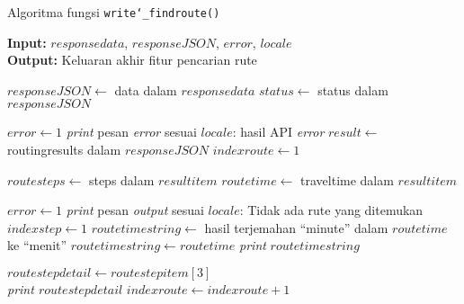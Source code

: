 \begin{algorithm}[h]
	\caption{\textendash\xspace Algoritma fungsi \texttt{write\char`_findroute()}}
	\label{alg:design-write-findroute}
	\vspace{-0.6\baselineskip}
	\begin{flushleft}
		\textbf{Input:} $responsedata$, $responseJSON$, $error$, $locale$ \\
		\textbf{Output:} Keluaran akhir fitur pencarian rute \\
	\end{flushleft}
	\vspace{-1.05\baselineskip}
	\begin{algorithmic}
		\State $responseJSON \gets$ data dalam $responsedata$
		\State $status \gets$ \textquotesingle\textquotesingle status\textquotesingle\textquotesingle\xspace dalam $responseJSON$
		
			\State $error \gets 1$
			\State \textit{print} pesan \textit{error} sesuai $locale$: hasil API \textit{error}
		\Else
			\State $result \gets$ \textquotesingle\textquotesingle routingresults\textquotesingle\textquotesingle\xspace dalam $responseJSON$
			\State $indexroute \gets 1$
			
			 
				\State $routesteps \gets$ \textquotesingle\textquotesingle steps\textquotesingle\textquotesingle\xspace dalam $resultitem$
				\State $routetime \gets$ \textquotesingle\textquotesingle traveltime\textquotesingle\textquotesingle\xspace dalam $resultitem$
				
					\State $error \gets 1$
					\State \textit{print} pesan \textit{output} sesuai $locale$: Tidak ada rute yang ditemukan
				\Else
					\State $indexstep \gets 1$
					 
						\State $routetimestring \gets$ hasil terjemahan ``minute'' dalam $routetime$ ke ``menit''
					\Else
						\State $routetimestring \gets routetime$
					\EndIf
					\State \textit{print} $routetimestring$
					
					 
						\State $routestepdetail \gets routestepitem[3]$ \\ 
						\State \textit{print $routestepdetail$}
					\EndFor
				\EndIf
				\State $indexroute \gets indexroute + 1$
			\EndFor
		\EndIf
	\end{algorithmic}
\end{algorithm}

